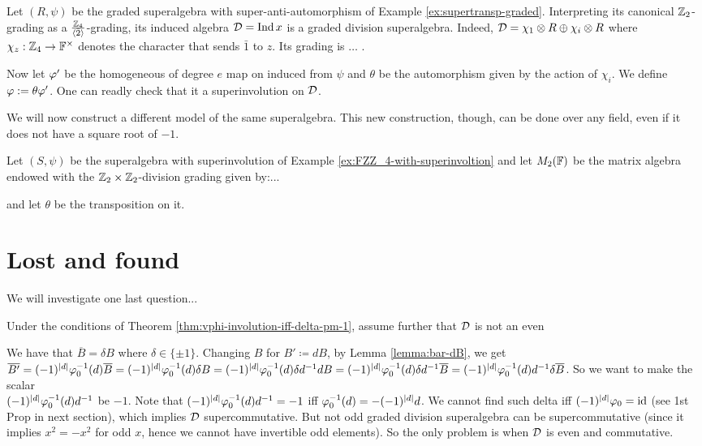 \begin{ex}
	Let $(R, \psi)$ be the graded superalgebra with su\-per-an\-ti-auto\-mor\-phism of Example \ref{ex:supertransp-graded}. Interpreting its canonical $\mathbb{Z}_2$-grading as a $\frac{\mathbb{Z}_4}{\langle \bar 2 \rangle}$-grading, its induced algebra $\mathcal{D} = \operatorname{Ind} x$ is a graded division superalgebra. Indeed, $\mathcal{D} = \chi_1 \otimes R \oplus \chi_i \otimes R$ where $\chi_z: \mathbb{Z}_4 \to \mathbb{F}^\times$ denotes the character that sends $\bar 1$ to $z$. Its grading is $\ldots$ .

	Now let $\varphi'$ be the homogeneous of degree $e$ map on induced from $\psi$ and $\theta$ be the automorphism given by the action of $\chi_i$. We define $\varphi := \theta \varphi'$. One can readly check that it a superinvolution on $\mathcal{D}$.
\end{ex}

We will now construct a different model of the same superalgebra. This new construction, though, can be done over any field, even if it does not have a square root of $-1$.


\begin{prop}
	Let $(S, \psi)$ be the superalgebra with superinvolution of Example \ref{ex:FZZ_4-with-superinvoltion} and let $M_2(\mathbb{F})$ be the matrix algebra endowed with the $\mathbb{Z}_2 \times \mathbb{Z}_2$-division grading given by:...

	and let $\theta$ be the transposition on it.
\end{prop}

\section{Lost and found}

We will investigate one last question...

\begin{cor}
	Under the conditions of Theorem \ref{thm:vphi-involution-iff-delta-pm-1}, assume further that $\mathcal{D}$ is not an even
\end{cor}

We have that $\overline B = \delta B $ where $\delta \in \{\pm 1\}$.
Changing $B$ for $B' \coloneqq dB$, by Lemma \ref{lemma:bar-dB}, we get $\overline{B'} = (-1)^{|d|} \varphi_0^{-1} (d) \overline B = (-1)^{|d|} \varphi_0^{-1} (d) \delta B = (-1)^{|d|} \varphi_0^{-1} (d) \delta d^{-1} d B = (-1)^{|d|} \varphi_0^{-1} (d) \delta d^{-1} \overline B = (-1)^{|d|} \varphi_0^{-1} (d) d^{-1} \delta \overline B$.
So we want to make the scalar \\ $(-1)^{|d|} \varphi_0^{-1} (d) d^{-1}$ be $-1$.
Note that $(-1)^{|d|} \varphi_0^{-1} (d) d^{-1} = -1$ iff $\varphi_0^{-1} (d) = - (-1)^{|d|} d$.
We cannot find such delta iff $ (-1)^{|d|} \varphi_0 = \operatorname{id}$ (see 1st Prop in next section), which implies $\mathcal{D}$ supercommutative. But not odd graded division superalgebra can be supercommutative (since it implies $x^2 = -x^2$ for odd $x$, hence we cannot have invertible odd elements). So the only problem is when $\mathcal{D}$ is even and commutative.

